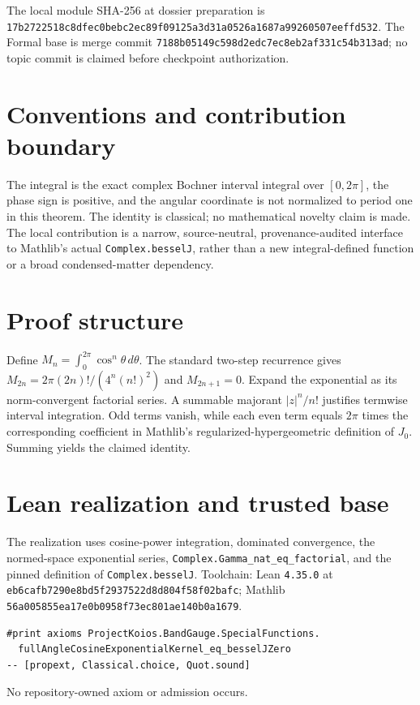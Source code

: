 \documentclass[10pt]{article}
\begin{document}
The local module SHA-256 at dossier preparation is
\texttt{17b2722518c8dfec0bebc2ec89f09125a3d31a0526a1687a99260507eeffd532}. The Formal base is
merge commit \texttt{7188b05149c598d2edc7ec8eb2af331c54b313ad}; no topic commit is claimed before
checkpoint authorization.

\section{Conventions and contribution boundary}
The integral is the exact complex Bochner interval integral over $[0,2\pi]$, the phase sign is
positive, and the angular coordinate is not normalized to period one in this theorem. The identity
is classical; no mathematical novelty claim is made. The local contribution is a narrow,
source-neutral, provenance-audited interface to Mathlib's actual \texttt{Complex.besselJ}, rather
than a new integral-defined function or a broad condensed-matter dependency.

\section{Proof structure}
Define $M_n=\int_0^{2\pi}\cos^n\theta\,d\theta$. The standard two-step recurrence gives
$M_{2n}=2\pi(2n)!/(4^n(n!)^2)$ and $M_{2n+1}=0$. Expand the exponential as its norm-convergent
factorial series. A summable majorant $|z|^n/n!$ justifies termwise interval integration. Odd terms
vanish, while each even term equals $2\pi$ times the corresponding coefficient in Mathlib's
regularized-hypergeometric definition of $J_0$. Summing yields the claimed identity.

\section{Lean realization and trusted base}
The realization uses cosine-power integration, dominated convergence, the normed-space exponential
series, \texttt{Complex.Gamma\_nat\_eq\_factorial}, and the pinned definition of
\texttt{Complex.besselJ}. Toolchain: Lean \texttt{4.35.0} at
\texttt{eb6cafb7290e8bd5f2937522d8d804f58f02bafc}; Mathlib
\texttt{56a005855ea17e0b0958f73ec801ae140b0a1679}.
\begin{verbatim}
#print axioms ProjectKoios.BandGauge.SpecialFunctions.
  fullAngleCosineExponentialKernel_eq_besselJZero
-- [propext, Classical.choice, Quot.sound]
\end{verbatim}
No repository-owned axiom or admission occurs.
\end{document}
